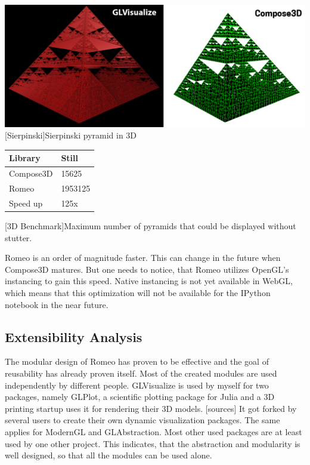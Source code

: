 \begin{minipage}{\linewidth}
    \centering
    \includegraphics[width=\linewidth]{graphics/sierpinsky.jpg}
    [Sierpinski]{Sierpinski pyramid in 3D}
    \label{fig:reactive1}
\end{minipage}
\begin{table}[htbp]
    \centering
    \begin{tabular}{l|l}
        \hline
        \textbf{Library} & \textbf{Still}\\ 
        \hline
        Compose3D        & 15625         \\
        Romeo            & 1953125       \\
        \hline
        \hline
        Speed up         & 125x          \\
    \end{tabular}
    [3D Benchmark]{Maximum number of pyramids that could be displayed without stutter.}
    \label{table:relativespeedoglw}
\end{table}

Romeo is an order of magnitude faster. This can change in the future when Compose3D matures.
But one needs to notice, that Romeo utilizes OpenGL's instancing to gain this speed. Native instancing is not yet available in WebGL, which means that this optimization will not be available for the IPython notebook in the near future.

\subsection{Extensibility Analysis}

The modular design of Romeo has proven to be effective and the goal of reusability has already proven itself.
Most of the created modules are used independently by different people.
GLVisualize is used by myself for two packages, namely GLPlot, a scientific plotting package for Julia and a 3D printing startup uses it for rendering their 3D models. [sources]
It got forked by several users to create their own dynamic visualization packages.
The same applies for ModernGL and GLAbstraction. Most other used packages are at least used by one other project.
This indicates, that the abstraction and modularity is well designed, so that all the modules can be used alone.

